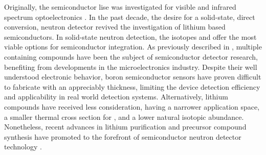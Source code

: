 \documentclass[../../../main.tex]{subfiles}
\begin{document}
%
    \Xsubsection%
    Originally, the semiconductor \gls{lise} was investigated for visible and infrared spectrum optoelectronics \cite{Kamijoh_1980}. 
    In the past decade, the desire for a \gls{solid-state}, direct conversion, neutron detector revived the investigation of lithium based semiconductors.
    In \gls{solid-state} neutron detection, the isotopes  and  offer the most viable options for semiconductor integration.
    As previously described in , multiple  containing compounds have been the subject of semiconductor detector research, benefiting from developments in the microelectronics industry.
    Despite their well understood electronic behavior, boron semiconductor sensors have proven difficult to fabricate with an appreciably thickness, limiting the device detection efficiency and applicability in real world detection systems.
    Alternatively, lithium compounds have received less consideration, having a narrower application space, a smaller thermal cross section for , and a lower natural isotopic abundance. 
    Nonetheless, recent advances in lithium purification and precursor compound synthesis have promoted  to the forefront of semiconductor neutron detector technology \cite{Tupitsyn_2012}.
\end{document}
